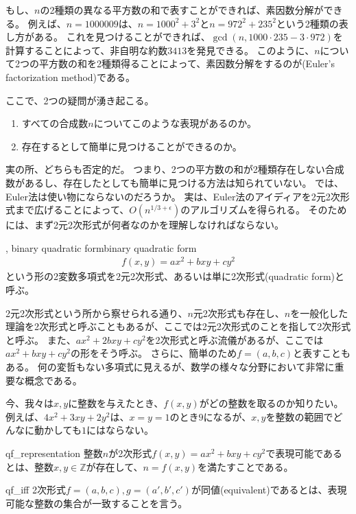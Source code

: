 もし、$n$の2種類の異なる平方数の和で表すことができれば、素因数分解ができる。
例えば、$n=1000009$は、$n=1000^2+3^2$と$n=972^2+235^2$という2種類の表し方がある。
これを見つけることができれば、$\gcd(n, 1000\cdot235 - 3\cdot972)$を計算することによって、非自明な約数$3413$を発見できる。
このように、$n$について2つの平方数の和を2種類得ることによって、素因数分解をするのが(Euler's factorization method)である。

ここで、2つの疑問が湧き起こる。
\begin{enumerate}
\item すべての合成数$n$についてこのような表現があるのか。
\item 存在するとして簡単に見つけることができるのか。
\end{enumerate}
実の所、どちらも否定的だ。
つまり、2つの平方数の和が2種類存在しない合成数があるし、存在したとしても簡単に見つける方法は知られていない。
では、Euler法は使い物にならないのだろうか。
実は、Euler法のアイディアを2元2次形式まで広げることによって、$O(n^{1/3+\epsilon})$のアルゴリズムを得られる。
そのためには、まず2元2次形式が何者なのかを理解しなければならない。

\begin{Defi}{, binary quadratic form}{binary quadratic form}
\begin{align*}
f(x,y) = ax^2 + bxy + cy^2
\end{align*}
という形の2変数多項式を2元2次形式、あるいは単に2次形式(quadratic form)と呼ぶ。
\end{Defi}

2元2次形式という所から察せられる通り、$n$元2次形式も存在し、$n$を一般化した理論を2次形式と呼ぶこともあるが、ここでは2元2次形式のことを指して2次形式と呼ぶ。
また、$ax^2 + 2bxy + cy^2$を2次形式と呼ぶ流儀があるが、ここでは$ax^2 + bxy + cy^2$の形をそう呼ぶ。
さらに、簡単のため$f=(a,b,c)$と表すこともある。
何の変哲もない多項式に見えるが、数学の様々な分野において非常に重要な概念である。

今、我々は$x,y$に整数を与えたとき、$f(x,y)$がどの整数を取るのか知りたい。
例えば、$4x^2+3xy+2y^2$は、$x=y=1$のとき$9$になるが、$x,y$を整数の範囲でどんなに動かしても$1$にはならない。

\begin{Defi}{}{qf_representation}
整数$n$が2次形式$f(x,y)=ax^2+bxy+cy^2$で表現可能であるとは、整数$x,y\in\mathbb{Z}$が存在して、$n=f(x,y)$を満たすことである。
\end{Defi}

\begin{Defi}{}{qf_iff}
2次形式$f=(a,b,c),g=(a',b',c')$が同値(equivalent)であるとは、表現可能な整数の集合が一致することを言う。
\end{Defi}

